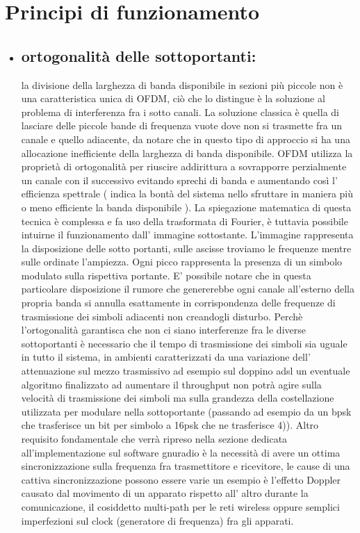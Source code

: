 \label{sec:problem}
\section{Principi di funzionamento}
\begin{itemize}
	 \item \subsection{ortogonalità delle sottoportanti: } la divisione della larghezza di banda disponibile in sezioni più piccole non è una caratteristica unica di OFDM, ciò che lo distingue è la soluzione al problema di interferenza fra i sotto canali. La soluzione classica è quella di lasciare delle piccole bande di frequenza vuote dove non si trasmette fra un canale e quello adiacente, da notare che in questo tipo di approccio si ha una allocazione inefficiente della larghezza di banda disponibile. OFDM utilizza la proprietà di ortogonalità per riuscire addirittura a sovrapporre perzialmente un canale con il successivo evitando sprechi di banda e aumentando così l' efficienza spettrale ( indica la bontà del sistema nello sfruttare in maniera più o meno efficiente la banda disponibile \cite{efficienzaSpettrale}).
	 La spiegazione matematica di questa tecnica è complessa e fa uso della trasformata di Fourier, è tuttavia possibile intuirne il funzionamento dall' immagine sottostante. L'immagine rappresenta la disposizione delle sotto portanti, sulle ascisse troviamo le frequenze mentre sulle ordinate l'ampiezza. Ogni picco rappresenta la presenza di un simbolo modulato sulla rispettiva portante. E' possibile notare che in questa particolare disposizione il rumore che genererebbe ogni canale all'esterno della propria banda si annulla esattamente in corrispondenza delle frequenze di trasmissione dei simboli adiacenti non creandogli disturbo. Perchè l'ortogonalità garantisca che non ci siano interferenze fra le diverse sottoportanti è necessario che il tempo di trasmissione dei simboli sia uguale in tutto il sistema, in ambienti caratterizzati da una variazione dell' attenuazione sul mezzo trasmissivo ad esempio sul doppino adsl un eventuale algoritmo finalizzato ad aumentare il throughput non potrà agire sulla velocità di trasmissione dei simboli ma sulla grandezza della costellazione utilizzata per modulare nella sottoportante (passando ad esempio da un bpsk che trasferisce un bit per simbolo a 16psk che ne trasferisce 4)). Altro requisito fondamentale che verrà ripreso nella sezione dedicata all'implementazione sul software gnuradio è la necessità di avere un ottima sincronizzazione sulla frequenza fra trasmettitore e ricevitore, le cause di una cattiva sincronizzazione possono essere varie un esempio è l'effetto Doppler causato dal movimento di un apparato rispetto all' altro durante la comunicazione, il cosiddetto multi-path per le reti wireless oppure semplici imperfezioni sul clock (generatore di frequenza) fra gli apparati.

\end{itemize}
